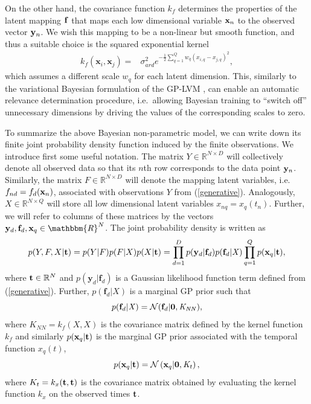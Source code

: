 \documentclass{article} %
\begin{document}
% 
On the other hand, the covariance function $k_f$ determines the
properties of the latent mapping $\mathbf{f}$ that maps each  low 
dimensional variable $\mathbf{x}_n$ to the observed vector $\mathbf{y}_n$. We wish
this mapping to be a non-linear but smooth function, and thus a suitable choice
is the squared exponential kernel
\begin{align}
\mathit{k_f} \left( \mathbf{x}_i, \mathbf{x}_j \right) = {} &  
		\sigma_{ard}^2 e^{
			- \frac{1}{2} \sum_{q=1}^{Q}  w_q \left(
                          \mathit{x_{i,q} - x_{j,q}} \right) ^2 },
\label{rbfard}
\end{align}
which assumes a different scale $w_q$ for each latent dimension. This,   
similarly to the variational Bayesian formulation of the GP-LVM 
\cite{BayesianGPLVM}, can enable an automatic relevance
determination procedure, i.e.\ allowing Bayesian training to ``switch off''
unnecessary dimensions by driving the values of 
the corresponding scales to zero.

To summarize the above Bayesian non-parametric model, 
we can write down its finite joint probability density 
function induced by the finite observations. We introduce first some 
useful notation. The matrix 
$\mathit{Y} \in \mathbb{R}^{N \times D}$ will collectively  denote 
all observed data so that its $n$th row corresponds to the data 
point $\mathbf{y}_n$. Similarly, the matrix  
$F \in \mathbb{R}^{N \times D}$ will denote the mapping latent variables,
i.e.\ $f_{nd} =f_d(\mathbf{x}_n)$, associated with observations $Y$ from
(\ref{generative}). Analogously,  $X \in \mathbb{R}^{N \times
  Q}$ will store all low dimensional latent variables 
$x_{nq}=x_q(t_n)$. Further, we will refer to columns of these 
matrices by the vectors $\bfy_d,\bff_d, \bfx_q \in
\mathbbm{R}^N$. The joint probability density is written as
\begin{equation}
\label{joint}
p(Y,F, X | \mathbf{t}) = p(Y|F) p(F|X) p(X |\mathbf{t})= 
 \prod_{d=1}^D  p(\mathbf{y}_d | \mathbf{f}_d) p(\mathbf{f}_d |
 \mathit{X}) \prod_{q=1}^Q p(\mathbf{x}_q | \mathbf{t}),
\end{equation}
where $\mathbf{t} \in \mathbb{R}^N$ and $p(\mathbf{y}_d | \mathbf{f}_d)$ 
is a Gaussian likelihood function term defined from  (\ref{generative}). 
Further, $p(\mathbf{f}_d | \mathit{X})$ is a marginal GP prior 
such that 
\begin{equation}
\label{priorF}
p(\mathbf{f}_d | \mathit{X}) = \mathcal{N}(\mathbf{f}_d |\mathbf{0}, \mathit{K_{NN}}),
\end{equation}
where $\mathit{K}_{NN}= \mathit{k}_f(X,X)$ is the covariance matrix
defined by the kernel function $\mathit{k}_f$ and similarly 
$p(\mathbf{x}_q|\mathbf{t})$ is the marginal GP prior associated with 
the temporal function $x_q(t)$,  
\begin{equation}
p(\mathbf{x}_q|\mathbf{t}) = \mathcal{N} \left( \mathbf{x}_q | \mathbf{0},
  \mathit{K_t} \right),
\label{priorXgivenT}
\end{equation}
where $K_t = k_x(\mathbf{t},\mathbf{t})$ is the covariance matrix obtained by
evaluating the kernel function $\mathit{k}_x$ on the observed times
$\mathbf{t}$. 
 
\end{document}
